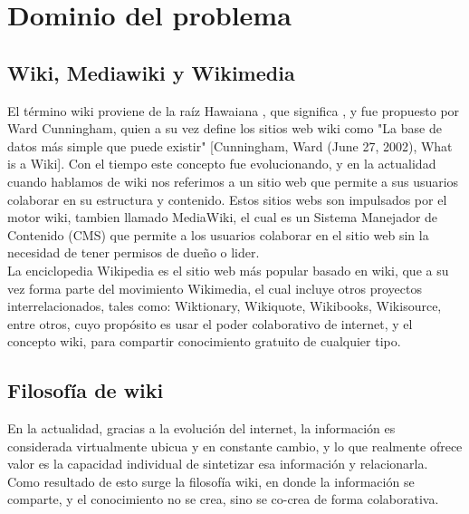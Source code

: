 \section{Dominio del problema}
    \subsection{Wiki, Mediawiki y Wikimedia}

        El término wiki proviene de la raíz Hawaiana , que significa , y fue propuesto por Ward Cunningham, quien a su vez define los sitios web wiki como "La base de datos más simple que puede existir" [Cunningham, Ward (June 27, 2002), What is a Wiki]. Con el tiempo este concepto fue evolucionando, y en la actualidad cuando hablamos de wiki nos referimos a un sitio web que permite a sus usuarios colaborar en su estructura y contenido. Estos sitios webs son impulsados por el motor wiki, tambien llamado MediaWiki, el cual es un Sistema Manejador de Contenido (CMS) que permite a los usuarios colaborar en el sitio web sin la necesidad de tener permisos de dueño o lider. \\

        La enciclopedia Wikipedia es el sitio web más popular basado en wiki, que a su vez forma parte del movimiento Wikimedia, el cual incluye otros proyectos interrelacionados, tales como: Wiktionary, Wikiquote, Wikibooks, Wikisource, entre otros, cuyo propósito es usar el poder colaborativo de internet, y el concepto wiki, para compartir conocimiento gratuito de cualquier tipo.\\
     
    \subsection{Filosofía de wiki}

        \iffalse  \fi
        
        En la actualidad, gracias a la evolución del internet, la información es considerada virtualmente ubicua y en constante cambio, y lo que realmente ofrece valor es la capacidad individual de sintetizar esa información y relacionarla. Como resultado de esto surge la filosofía wiki, en donde la información se comparte, y el conocimiento no se crea, sino se co-crea de forma colaborativa. \\

